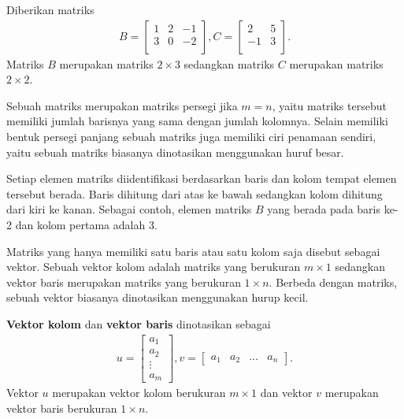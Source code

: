 \begin{contoh}
    Diberikan matriks
    \begin{align*}
        B=
\begin{bmatrix}
1 & 2 & -1\\
3 & 0 & -2\\ 
\end{bmatrix}
,C=
\begin{bmatrix}
2 & 5\\
-1 & 3\\ 
\end{bmatrix}.
    \end{align*}
    Matriks $B$ merupakan matriks $2 \times 3$ sedangkan matriks $C$ merupakan matriks $2 \times 2$.
\end{contoh}
Sebuah matriks merupakan matriks persegi jika $m=n$, yaitu matriks \mbox{tersebut} memiliki jumlah barisnya yang sama dengan jumlah kolomnya. Selain memiliki bentuk persegi panjang sebuah matriks juga memiliki ciri penamaan sendiri, yaitu sebuah matriks biasanya dinotasikan menggunakan huruf besar. 

Setiap elemen matriks diidentifikasi berdasarkan baris dan kolom tempat elemen tersebut berada. Baris dihitung dari atas ke bawah sedangkan kolom \mbox{dihitung} dari kiri ke kanan. Sebagai contoh, elemen matriks $B$ yang berada pada baris ke-2 dan kolom pertama adalah 3.

Matriks yang hanya memiliki satu baris atau satu kolom saja disebut \mbox{sebagai} vektor. Sebuah vektor kolom adalah matriks yang berukuran $m \times 1$ sedangkan \mbox{vektor} baris merupakan matriks yang berukuran $1 \times n$. Berbeda dengan matriks, sebuah vektor biasanya dinotasikan menggunakan hurup kecil. 
\begin{definisi}
\textbf{Vektor kolom} dan \textbf{vektor baris} dinotasikan sebagai
\begin{align*}
    u=\begin{bmatrix}
        a_1\\
        a_2\\
        \vdots\\
        a_m
    \end{bmatrix},
    v=\begin{bmatrix}
        a_1 & a_2 & \dots & a_n
    \end{bmatrix}.
\end{align*}
Vektor $u$ merupakan vektor kolom berukuran $m \times 1$ dan vektor $v$ merupakan vektor baris berukuran $1 \times n$.
\end{definisi}

